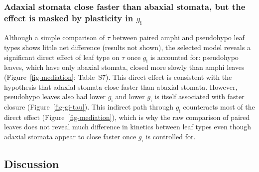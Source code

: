 \documentclass[
  letterpaper,
  DIV=11,
  numbers=noendperiod]{scrartcl}
\newcommand{\gi}{$g_\mathrm{i}$}
\begin{document}
\subsubsection{\texorpdfstring{Adaxial stomata close faster than abaxial
stomata, but the effect is masked by plasticity in
\gi{}}{Adaxial stomata close faster than abaxial stomata, but the effect is masked by plasticity in }}\label{adaxial-stomata-close-faster-than-abaxial-stomata-but-the-effect-is-masked-by-plasticity-in}

Although a simple comparison of \(\tau\) between paired amphi and
pseudohypo leaf types shows little net difference (results not shown),
the selected model reveals a significant direct effect of leaf type on
\(\tau\) once \gi{} is accounted for: pseudohypo leaves, which have only
abaxial stomata, closed more slowly than amphi leaves
(Figure~\ref{fig-mediation}; Table~S7). This direct effect
is consistent with the hypothesis that adaxial stomata close faster than
abaxial stomata. However, pseudohypo leaves also had lower \gi{} and
lower \gi{} is itself associated with faster closure
(Figure~\ref{fig-gi-tau}). This indirect path through \gi{} counteracts
most of the direct effect (Figure~\ref{fig-mediation}), which is why the
raw comparison of paired leaves does not reveal much difference in
kinetics between leaf types even though adaxial stomata appear to close
faster once \gi{} is controlled for.

\subsection{Discussion}\label{discussion}
\end{document}
